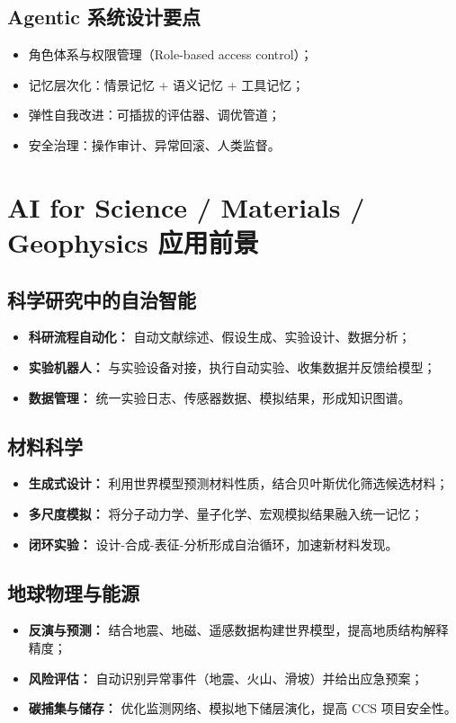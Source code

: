 \documentclass[UTF8,zihao=-4]{ctexart}
\begin{document}
\subsection{Agentic 系统设计要点}
\begin{itemize}
  \item 角色体系与权限管理（Role-based access control）；
  \item 记忆层次化：情景记忆 + 语义记忆 + 工具记忆；
  \item 弹性自我改进：可插拔的评估器、调优管道；
  \item 安全治理：操作审计、异常回滚、人类监督。
\end{itemize}

\section{AI for Science / Materials / Geophysics 应用前景}
\subsection{科学研究中的自治智能}
\begin{itemize}
  \item \textbf{科研流程自动化：} 自动文献综述、假设生成、实验设计、数据分析；
  \item \textbf{实验机器人：} 与实验设备对接，执行自动实验、收集数据并反馈给模型；
  \item \textbf{数据管理：} 统一实验日志、传感器数据、模拟结果，形成知识图谱。
\end{itemize}

\subsection{材料科学}
\begin{itemize}
  \item \textbf{生成式设计：} 利用世界模型预测材料性质，结合贝叶斯优化筛选候选材料；
  \item \textbf{多尺度模拟：} 将分子动力学、量子化学、宏观模拟结果融入统一记忆；
  \item \textbf{闭环实验：} 设计-合成-表征-分析形成自治循环，加速新材料发现。
\end{itemize}

\subsection{地球物理与能源}
\begin{itemize}
  \item \textbf{反演与预测：} 结合地震、地磁、遥感数据构建世界模型，提高地质结构解释精度；
  \item \textbf{风险评估：} 自动识别异常事件（地震、火山、滑坡）并给出应急预案；
  \item \textbf{碳捕集与储存：} 优化监测网络、模拟地下储层演化，提高 CCS 项目安全性。
\end{itemize}
\end{document}
